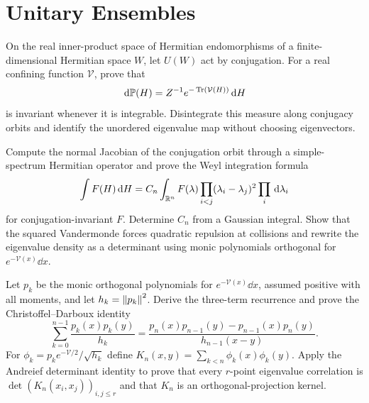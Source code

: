 \section{Unitary Ensembles}

\begin{exercise}
On the real inner-product space of Hermitian endomorphisms of a
finite-dimensional Hermitian space $W$, let
$U(W)$ act by conjugation.  For a real confining function $\mathcal V$, prove
that
\[
 \,\mathrm d\mathbb P(H)=Z^{-1}e^{-\operatorname{Tr}(\mathcal V(H))}\,\mathrm d H
\]
is invariant whenever it is integrable.  Disintegrate this measure along
conjugacy orbits and identify the unordered eigenvalue map without choosing
eigenvectors.
\end{exercise}

\begin{exercise}
Compute the normal Jacobian of the conjugation orbit through a simple-spectrum
Hermitian operator and prove the Weyl integration formula
\[
 \int F(H)\,\mathrm d H=C_n\int_{\mathbb R^n}F(\lambda)
 \prod_{i<j}(\lambda_i-\lambda_j)^2\prod_i\,\mathrm d\lambda_i
\]
for conjugation-invariant $F$.  Determine $C_n$ from a Gaussian integral.
Show that the squared Vandermonde forces quadratic repulsion at collisions and
rewrite the eigenvalue density as a determinant using monic polynomials
orthogonal for $e^{-\mathcal V(x)}\dd x$.
\end{exercise}

\begin{exercise}
Let $p_k$ be the monic orthogonal polynomials for
$e^{-\mathcal V(x)}\dd x$, assumed positive with all moments, and let
$h_k=\left\lVert p_k\right\rVert^2$.  Derive the three-term recurrence and
prove the Christoffel--Darboux identity
\[
 \sum_{k=0}^{n-1}\frac{p_k(x)p_k(y)}{h_k}
 =\frac{p_n(x)p_{n-1}(y)-p_{n-1}(x)p_n(y)}{h_{n-1}(x-y)}.
\]
For $\phi_k=p_ke^{-\mathcal V/2}/\sqrt{h_k}$ define
$K_n(x,y)=\sum_{k<n}\phi_k(x)\phi_k(y)$.  Apply the Andreief determinant
identity to prove that every $r$-point eigenvalue correlation is
$\det(K_n(x_i,x_j))_{i,j\le r}$ and that $K_n$ is an orthogonal-projection
kernel.
\end{exercise}

